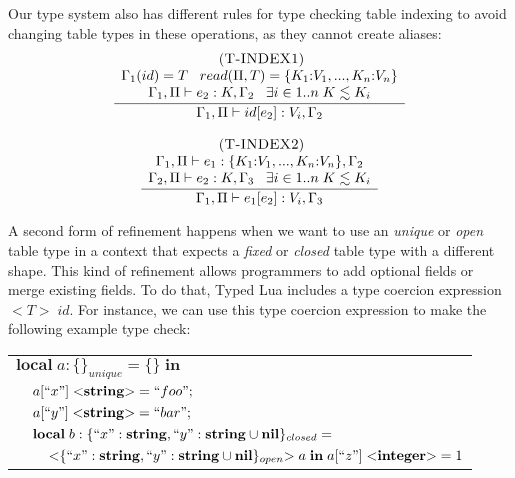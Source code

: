 Our type system also has different rules for type checking table indexing to avoid
changing table types in these operations, as they cannot create aliases:
\[
\begin{array}{c}
\begin{array}{c}
\; (\textsc{T-INDEX1})\\
\dfrac{\begin{array}{c}
       \Gamma_{1}(id) = T \;\;\;
       read(\Pi, T) = \{K_{1}{:}V_{1}, ..., K_{n}{:}V_{n}\}\\
       \Gamma_{1}, \Pi \vdash e_{2}:K, \Gamma_{2} \;\;\;
       \exists i \in 1{..}n \; K \lesssim K_{i}
       \end{array}}
      {\Gamma_{1}, \Pi \vdash id[e_{2}]:V_{i}, \Gamma_{2}}
\end{array}
\\ \\
\begin{array}{c}
\; (\textsc{T-INDEX2})\\
\dfrac{\begin{array}{c}
       \Gamma_{1}, \Pi \vdash e_{1}:\{K_{1}{:}V_{1}, ..., K_{n}{:}V_{n}\}, \Gamma_{2}\\
       \Gamma_{2}, \Pi \vdash e_{2}:K, \Gamma_{3} \;\;\;
       \exists i \in 1{..}n \; K \lesssim K_{i}
       \end{array}}
      {\Gamma_{1}, \Pi \vdash e_{1}[e_{2}]:V_{i}, \Gamma_{3}}
\end{array}
\end{array}
\]

A second form of refinement happens when we want to use an
\emph{unique} or \emph{open} table type in a context that expects a
\emph{fixed} or \emph{closed} table type with a different shape.
This kind of refinement allows programmers to add optional fields
or merge existing fields.
To do that, Typed Lua includes a type coercion expression ${<}T{>} \; id$.
For instance, we can use this type coercion expression to make the following
example type check:
\begin{center}
\begin{tabular}{lll}
\multicolumn{3}{l}{$\mathbf{local} \; a:\{\}_{unique} = \{ \} \; \mathbf{in}$}\\
& \multicolumn{2}{l}{$a[``x"] \; {<}\mathbf{string}{>} = ``foo";$}\\
& \multicolumn{2}{l}{$a[``y"] \; {<}\mathbf{string}{>} = ``bar";$}\\
& \multicolumn{2}{l}{$\mathbf{local} \; b:\{``x":\mathbf{string}, ``y":\mathbf{string} \cup \mathbf{nil} \}_{closed} =$}\\
& & \multicolumn{1}{l}{${<}\{``x":\mathbf{string}, ``y":\mathbf{string} \cup \mathbf{nil}\}_{open}{>} \; a \; \mathbf{in} \; a[``z"] \; {<}\mathbf{integer}{>} = 1$}
\end{tabular}
\end{center}

